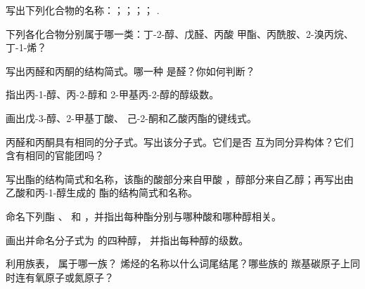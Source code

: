 \begin{exercise}[$\star$]\label{exo:g11:functional-groups:2}
写出下列化合物的名称：；；；；
.
\end{exercise}

\begin{exercise}[$\star$]\label{exo:g11:functional-groups:3}
下列各化合物分别属于哪一类：丁-2-醇、戊醛、丙酸
甲酯、丙酰胺、2-溴丙烷、丁-1-烯？
\end{exercise}

\begin{exercise}[$\star$]\label{exo:g11:functional-groups:4}
写出丙醛和丙酮的结构简式。哪一种
是醛？你如何判断？
\end{exercise}

\begin{exercise}[$\star$]\label{exo:g11:functional-groups:5}
指出丙-1-醇、丙-2-醇和 2-甲基丙-2-醇的醇级数。
\end{exercise}

\begin{exercise}[$\star\star$]\label{exo:g11:functional-groups:6}
画出戊-3-醇、2-甲基丁酸、
己-2-酮和乙酸丙酯的键线式。
\end{exercise}

\begin{exercise}[$\star\star$]\label{exo:g11:functional-groups:7}
丙醛和丙酮具有相同的分子式。写出该分子式。它们是否
互为同分异构体？它们含有相同的官能团吗？
\end{exercise}

\begin{exercise}[$\star\star$]\label{exo:g11:functional-groups:8}
写出酯的结构简式和名称，该酯的酸部分来自甲酸
，醇部分来自乙醇；再写出由乙酸和丙-1-醇生成的
酯的结构简式和名称。
\end{exercise}

\begin{exercise}[$\star\star$]\label{exo:g11:functional-groups:9}
命名下列酯 、 和
，并指出每种酯分别与哪种酸和哪种醇相关。
\end{exercise}

\begin{exercise}[$\star\star$]\label{exo:g11:functional-groups:10}
画出并命名分子式为  的四种醇，
并指出每种醇的级数。
\end{exercise}

\begin{exercise}[$\star\star$]\label{exo:g11:functional-groups:11}
利用族表， 属于哪一族？
烯烃的名称以什么词尾结尾？哪些族的
羰基碳原子上同时连有氧原子或氮原子？
\end{exercise}


